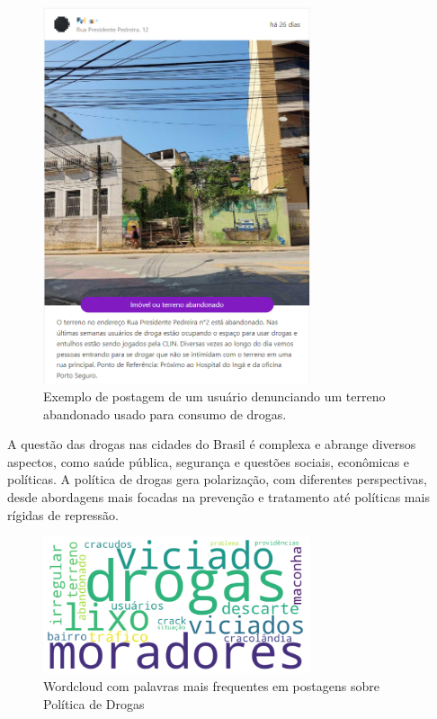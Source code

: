 \begin{figure}[htb]
	\centering
	\includegraphics[width=0.7\textwidth]{images/colab_posts_drugs.png}
	\caption{Exemplo de postagem de um usuário denunciando um terreno abandonado usado para consumo de drogas.}
	\label{fig:colab_posts_drugs}
\end{figure}

A questão das drogas nas cidades do Brasil é complexa e abrange diversos aspectos, como saúde pública, segurança e questões sociais, econômicas e políticas. A política de drogas gera polarização, com diferentes perspectivas, desde abordagens mais focadas na prevenção e tratamento até políticas mais rígidas de repressão.

\begin{figure}[htb]
	\centering
	\includegraphics[width=0.7\textwidth]{images/wordcloud_drugs.png}
	\caption{Wordcloud com palavras mais frequentes em postagens sobre Política de Drogas}
	\label{fig:wordcloud_drugs}
\end{figure}

